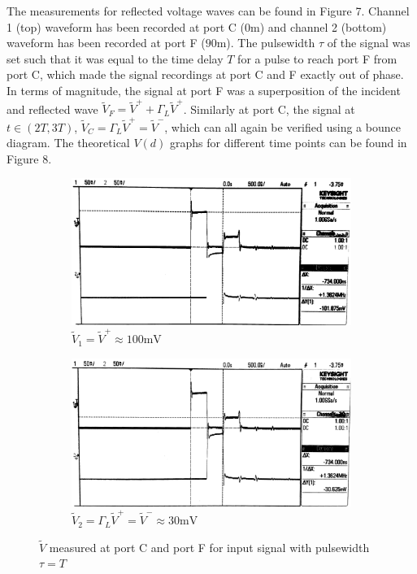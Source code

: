 \documentclass[10pt]{article}
\begin{document}
The measurements for reflected voltage waves can be found in Figure 7. Channel 1 (top) waveform has been 
recorded at port C ($0\text{m}$) and channel 2 (bottom) waveform has been recorded at port F ($90\text{m}$).
The pulsewidth $\tau$ of the signal was set such that it was equal to the time delay $T$ for a pulse to reach
port F from port C, which made the signal recordings at port C and F exactly out of phase. In terms of magnitude, the
signal at port F was a superposition of the incident and reflected wave $\tilde V_F = \tilde V^+ + \Gamma_L\tilde V^+$.
Similarly at port C, the signal at $t \in (2T, 3T)$, $\tilde V_C = \Gamma_L\tilde V^+ = \tilde V^-$, which can all again
be verified using a bounce diagram. The theoretical $V(d)$ graphs for different time points can be found in Figure 8.

\begin{figure}[ht]
    \centering
    \begin{subfigure}[b]{0.45\textwidth}
        \includegraphics[width=\textwidth]{../photos/lab1/v_t_gamma_L_1.jpg}
        \caption{$\tilde V_1 = \tilde V^+ \approx 100\text{mV}$}
    \end{subfigure}
    \quad
    \begin{subfigure}[b]{0.45\textwidth}
        \includegraphics[width=\textwidth]{../photos/lab1/v_t_gamma_L_2.jpg}
        \caption{$\tilde V_2 = \Gamma_L\tilde V^+ = \tilde V^- \approx 30\text{mV}$}
    \end{subfigure}
    \caption{$\tilde V$ measured at port C and port F for input signal with pulsewidth $\tau = T$\vspace{-0.5cm}}
    \label{v_t_c_f}
\end{figure}
\end{document}
